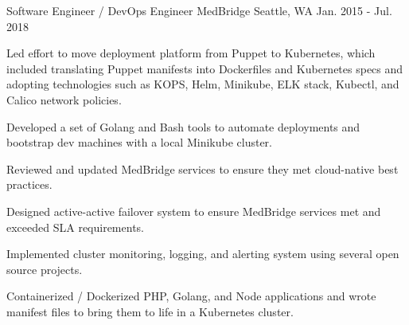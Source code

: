 \begin{cventries}

\cventry
{Software Engineer / DevOps Engineer} %
{MedBridge} %
{Seattle, WA} %
{Jan. 2015 - Jul. 2018} %
{ %
\begin{cvitems}
\item {Led effort to move deployment platform from Puppet to Kubernetes, which included translating Puppet manifests into Dockerfiles and Kubernetes specs and adopting technologies such as KOPS, Helm, Minikube, ELK stack, Kubectl, and Calico network policies.}
\item {Developed a set of Golang and Bash tools to automate deployments and bootstrap dev machines with a local Minikube cluster.}
\item {Reviewed and updated MedBridge services to ensure they met cloud-native best practices.}
\item {Designed active-active failover system to ensure MedBridge services met and exceeded SLA requirements.}
\item {Implemented cluster monitoring, logging, and alerting system using several open source projects.} 
\item {Containerized / Dockerized PHP, Golang, and Node applications and wrote manifest files to bring them to life in a Kubernetes cluster.}
\end{cvitems}
}




\end{cventries}

